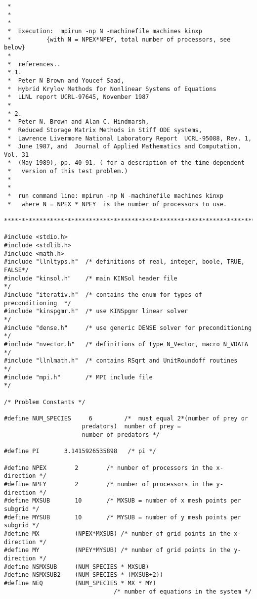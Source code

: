 \documentclass[11pt]{article}
\begin{document}
\begin{verbatim}
 * 
 *
 * 
 *  Execution:  mpirun -np N -machinefile machines kinxp
 *          {with N = NPEX*NPEY, total number of processors, see below}
 *
 *  references..
 * 1.
 *  Peter N Brown and Youcef Saad,
 *  Hybrid Krylov Methods for Nonlinear Systems of Equations
 *  LLNL report UCRL-97645, November 1987
 *  
 * 2.
 *  Peter N. Brown and Alan C. Hindmarsh,
 *  Reduced Storage Matrix Methods in Stiff ODE systems,
 *  Lawrence Livermore National Laboratory Report  UCRL-95088, Rev. 1,
 *  June 1987, and  Journal of Applied Mathematics and Computation, Vol. 31
 *  (May 1989), pp. 40-91. ( for a description of the time-dependent
 *   version of this test problem.)
 *
 *
 *  run command line: mpirun -np N -machinefile machines kinxp 
 *   where N = NPEX * NPEY  is the number of processors to use.
 ************************************************************************/

#include <stdio.h>
#include <stdlib.h>
#include <math.h>
#include "llnltyps.h"  /* definitions of real, integer, boole, TRUE, FALSE*/
#include "kinsol.h"    /* main KINSol header file                         */
#include "iterativ.h"  /* contains the enum for types of preconditioning  */
#include "kinspgmr.h"  /* use KINSpgmr linear solver                      */
#include "dense.h"     /* use generic DENSE solver for preconditioning    */
#include "nvector.h"   /* definitions of type N_Vector, macro N_VDATA     */
#include "llnlmath.h"  /* contains RSqrt and UnitRoundoff routines        */
#include "mpi.h"       /* MPI include file                                */

/* Problem Constants */

#define NUM_SPECIES     6         /*  must equal 2*(number of prey or
                      predators)  number of prey = 
                      number of predators */

#define PI       3.1415926535898   /* pi */ 

#define NPEX        2        /* number of processors in the x-direction */
#define NPEY        2        /* number of processors in the y-direction */
#define MXSUB       10       /* MXSUB = number of x mesh points per subgrid */
#define MYSUB       10       /* MYSUB = number of y mesh points per subgrid */
#define MX          (NPEX*MXSUB) /* number of grid points in the x-direction */
#define MY          (NPEY*MYSUB) /* number of grid points in the y-direction */
#define NSMXSUB     (NUM_SPECIES * MXSUB)
#define NSMXSUB2    (NUM_SPECIES * (MXSUB+2))
#define NEQ         (NUM_SPECIES * MX * MY)  
                               /* number of equations in the system */


\end{verbatim}
\end{document}
